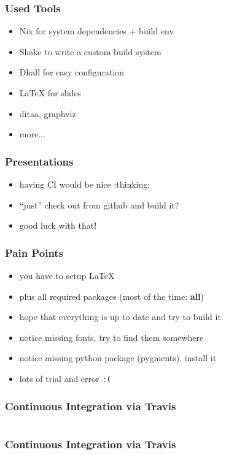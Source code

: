 \documentclass{beamer}
\begin{document}
\begin{frame}
  \frametitle{Used Tools}
  \begin{itemize}
  \item Nix for system dependencies + build env
  \item Shake to write a custom build system
  \item Dhall for easy configuration
  \item LaTeX for slides
  \item ditaa, graphviz
  \item more...
  \end{itemize}
\end{frame}

\begin{frame}
  \frametitle{Presentations}
  \begin{itemize}
  \item having CI would be nice :thinking:
  \item ``just'' check out from github and build it?
  \item good luck with that!
  \end{itemize}
\end{frame}

\begin{frame}
  \frametitle{Pain Points}
  \begin{itemize}
  \item you have to setup LaTeX
  \item plus all required packages (most of the time: \textbf{all})
  \item hope that everything is up to date and try to build it
  \item notice missing fonts, try to find them somewhere
  \item notice missing python package (pygments), install it
  \item lots of trial and error \texttt{:(}
  \end{itemize}
\end{frame}

\begin{frame}
  \frametitle{Continuous Integration via Travis}
  \inputminted[linenos=false, fontsize=\tiny, lastline=31]{yaml}{static-source/long-travis-ci.yml}
\end{frame}

\begin{frame}
  \frametitle{Continuous Integration via Travis}
  \inputminted[linenos=false, fontsize=\tiny, firstline=31, lastline=60]{yaml}{static-source/long-travis-ci.yml}
\end{frame}
\end{document}
